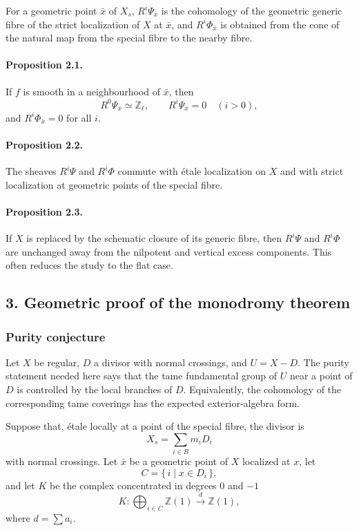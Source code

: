 \documentclass[12pt]{article}
\newcommand{\ZZ}{\mathbb Z}
\begin{document}
For a geometric point $\bar x$ of $X_s$, $R^i\Psi_{\bar x}$ is the cohomology of the geometric generic fibre of the strict localization of $X$ at $\bar x$, and $R^i\Phi_{\bar x}$ is obtained from the cone of the natural map from the special fibre to the nearby fibre.

\paragraph{Proposition 2.1.}
If $f$ is smooth in a neighbourhood of $\bar x$, then
\[
R^0\Psi_{\bar x}\simeq\ZZ_\ell,\qquad R^i\Psi_{\bar x}=0\quad(i>0),
\]
and $R^i\Phi_{\bar x}=0$ for all $i$.

\paragraph{Proposition 2.2.}
The sheaves $R^i\Psi$ and $R^i\Phi$ commute with étale localization on $X$ and with strict localization at geometric points of the special fibre.

\paragraph{Proposition 2.3.}
If $X$ is replaced by the schematic closure of its generic fibre, then $R^i\Psi$ and $R^i\Phi$ are unchanged away from the nilpotent and vertical excess components. This often reduces the study to the flat case.

\subsection*{3. Geometric proof of the monodromy theorem}

\subsubsection*{Purity conjecture}

Let $X$ be regular, $D$ a divisor with normal crossings, and $U=X-D$. The purity statement needed here says that the tame fundamental group of $U$ near a point of $D$ is controlled by the local branches of $D$. Equivalently, the cohomology of the corresponding tame coverings has the expected exterior-algebra form.

Suppose that, étale locally at a point of the special fibre, the divisor is
\[
X_s=\sum_{i\in B}m_iD_i
\]
with normal crossings. Let $\bar x$ be a geometric point of $X$ localized at $x$, let
\[
C=\{\,i\mid x\in D_i\,\},
\]
and let $K$ be the complex concentrated in degrees $0$ and $-1$
\[
K:\bigoplus_{i\in C}\ZZ(1)\xrightarrow{\ d\ }\ZZ(1),
\]
where $d=\sum a_i$.
\end{document}
